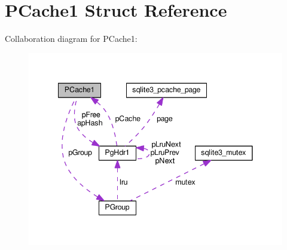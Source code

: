 \hypertarget{structPCache1}{}\section{P\+Cache1 Struct Reference}
\label{structPCache1}


Collaboration diagram for P\+Cache1\+:\nopagebreak
\begin{figure}[H]
\begin{center}
\leavevmode
\includegraphics[width=341pt]{structPCache1__coll__graph}
\end{center}
\end{figure}
